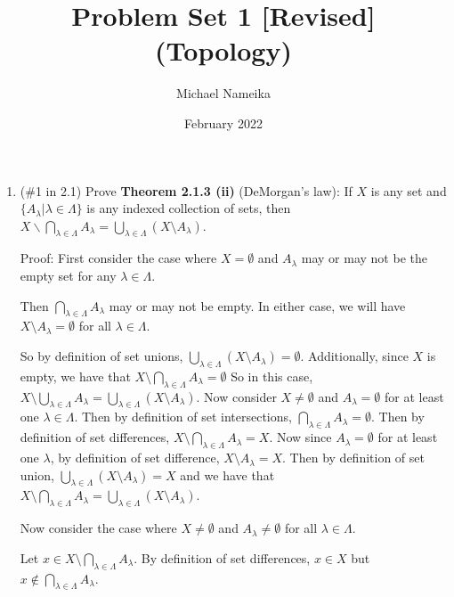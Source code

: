 \documentclass{article}
\title{Problem Set 1  [Revised] (Topology)}
\author{Michael Nameika}
\date{February 2022}
\begin{document}
\maketitle
\begin{enumerate}
\item{}
(\#1 in 2.1) Prove \textbf{Theorem 2.1.3 (ii)} (DeMorgan's law): If $X$ is any set and $\{A_{\lambda}|\lambda\in\Lambda\}$ is any indexed collection of sets, then $X\backslash \bigcap_{\lambda\in\Lambda} A_{\lambda} = \bigcup_{\lambda \in \Lambda}(X\setminus A_{\lambda})$.
\newline

Proof: First consider the case where $X = \emptyset$ and $A_{\lambda}$ may or may not be the empty set for any $\lambda \in \Lambda$. 

Then $\bigcap_{\lambda \in \Lambda} A_{\lambda}$ may or may not be empty. In either case, we will have $X \setminus A_{\lambda} = \emptyset$ for all $\lambda \in \Lambda$.


So by definition of set unions, $\bigcup_{\lambda \in \Lambda} (X \setminus A_{\lambda}) = \emptyset$. Additionally, since $X$ is empty, we have that $X \setminus \bigcap_{\lambda \in \Lambda}A_{\lambda} = \emptyset$
So in this case, $X \setminus \bigcup_{\lambda \in \Lambda}A_{\lambda} = \bigcup_{\lambda \in \Lambda} (X \setminus A_{\lambda})$.
\newline\newline
Now consider $X \neq \emptyset$ and $A_{\lambda} = \emptyset$ for at least one $\lambda \in \Lambda$. Then by definition of set intersections, $\bigcap_{\lambda \in \Lambda} A_{\lambda} = \emptyset$. Then by definition of set differences, $X \setminus \bigcap_{\lambda \in \Lambda} A_{\lambda} = X$. Now since $A_{\lambda} = \emptyset$ for at least one $\lambda$, by definition of set difference, $X \setminus A_{\lambda} = X$. Then by definition of set union, $\bigcup_{\lambda \in \Lambda}(X \setminus A_{\lambda}) = X$
and we have that $X \setminus \bigcap_{\lambda \in \Lambda} A_{\lambda} = \bigcup_{\lambda \in \Lambda} (X \setminus A_{\lambda})$.
\newline\newline

Now consider the case where $X \neq \emptyset$ and $A_{\lambda} \neq \emptyset$ for all $\lambda \in \Lambda$.
\newline

Let $x \in X \setminus \bigcap_{\lambda \in \Lambda} A_{\lambda}$. By definition of set differences, $x \in X$ but $x \notin \bigcap_{\lambda \in \Lambda} A_{\lambda}$.
\newline


\end{enumerate}
\end{document}

